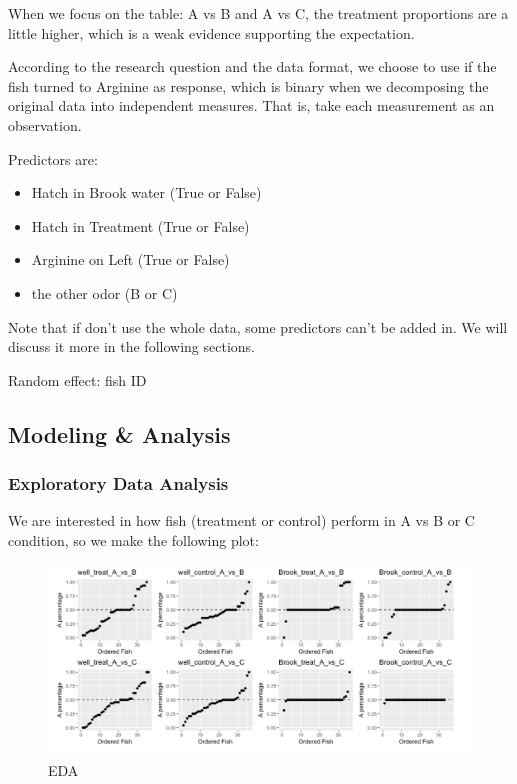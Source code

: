\documentclass{article}
\begin{document}
	When we focus on the table: A vs B and A vs C, the treatment proportions are a little higher, which is a weak evidence supporting the expectation.

	According to the research question and the data format, we choose to use if the fish turned to Arginine as response, which is binary when we decomposing the original data into independent measures. That is, take each measurement as an observation.
	
	Predictors are:
	\begin{itemize}
		\item Hatch in Brook water (True or False)
		\item Hatch in Treatment (True or False)
		\item Arginine on Left (True or False)
		\item the other odor (B or C)
	\end{itemize}

	Note that if don’t use the whole data, some predictors can’t be added in. We will discuss it more in the following sections. 
	
	Random effect: fish ID

	\subsection{Modeling \& Analysis}
	\subsubsection{Exploratory Data Analysis}
	We are interested in how fish (treatment or control) perform in A vs B or C condition, so we make the following plot:
	
	\begin{figure}[h]
		\centering
		\includegraphics[width=1\textwidth]{EDAsalmon}
		\caption{EDA}
		\label{fig:eda_salmon}
	\end{figure}
	
\end{document}
